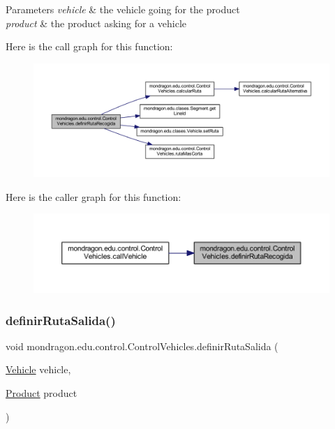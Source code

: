 \begin{DoxyParams}{Parameters}
{\em vehicle} & the vehicle going for the product \\
\hline
{\em product} & the product asking for a vehicle \\
\hline
\end{DoxyParams}
Here is the call graph for this function\+:\nopagebreak
\begin{figure}[H]
\begin{center}
\leavevmode
\includegraphics[width=350pt]{classmondragon_1_1edu_1_1control_1_1_control_vehicles_ac45999cf276055a6695eaf35cf781775_cgraph}
\end{center}
\end{figure}
Here is the caller graph for this function\+:\nopagebreak
\begin{figure}[H]
\begin{center}
\leavevmode
\includegraphics[width=350pt]{classmondragon_1_1edu_1_1control_1_1_control_vehicles_ac45999cf276055a6695eaf35cf781775_icgraph}
\end{center}
\end{figure}
\mbox{\label{classmondragon_1_1edu_1_1control_1_1_control_vehicles_affe370c8235e69844a66697e87f2bb37}} 
\subsubsection{\texorpdfstring{definirRutaSalida()}{definirRutaSalida()}}
{\footnotesize\ttfamily void mondragon.\+edu.\+control.\+Control\+Vehicles.\+definir\+Ruta\+Salida (\begin{DoxyParamCaption}\item[{\mbox{\hyperlink{classmondragon_1_1edu_1_1clases_1_1_vehicle}{Vehicle}}}]{vehicle,  }\item[{\mbox{\hyperlink{classmondragon_1_1edu_1_1clases_1_1_product}{Product}}}]{product }\end{DoxyParamCaption})\hspace{0.3cm}{\ttfamily [inline]}}

